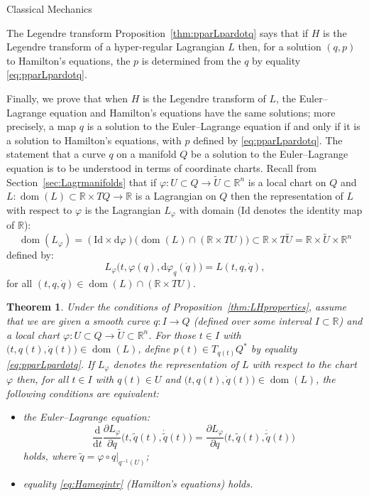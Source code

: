 \documentclass[oneside,a4paper,11pt]{amsbook}
\newcommand{\R}{\mathds R}
\newcommand{\dd}{\mathrm d}
\newcommand{\Id}{\mathrm{Id}}
\DeclareMathOperator{\Dom}{dom}
\theoremstyle{remark}\newtheorem{exercise}{Exercise}[chapter]
\theoremstyle{plain}\newtheorem{teo}{Theorem}[section]
\theoremstyle{plain}\newtheorem{lem}[teo]{Lemma}
\theoremstyle{plain}\newtheorem{prop}[teo]{Proposition}
\theoremstyle{plain}\newtheorem{cor}[teo]{Corollary}
\theoremstyle{definition}\newtheorem{defin}[teo]{Definition}
\theoremstyle{remark}\newtheorem{rem}[teo]{Remark}
\theoremstyle{definition}\newtheorem{notation}[teo]{Notation}
\theoremstyle{definition}\newtheorem{convention}[teo]{Convention}
\theoremstyle{definition}\newtheorem{example}[teo]{Example}
\numberwithin{section}{chapter}
\numberwithin{equation}{section}
\begin{document}
\begin{chapter}{Classical Mechanics}
\begin{section}{The Legendre transform}
Proposition~\ref{thm:pparLpardotq} says that if $H$ is the Legendre transform of a hyper-regular Lagrangian $L$ then, for a solution $(q,p)$
to Hamilton's equations, the $p$ is determined from the $q$ by equality \eqref{eq:pparLpardotq}.

\medskip

Finally, we prove that when $H$ is the Legendre transform of $L$, the Euler--Lagrange equation and Hamilton's equations have the same solutions;
more precisely, a map $q$ is a solution to the Euler--Lagrange equation if and only if it is a solution
to Hamilton's equations, with $p$ defined by \eqref{eq:pparLpardotq}. The statement that a curve $q$ on a manifold
$Q$ be a solution to the Euler--Lagrange equation is to be understood in terms of coordinate charts. Recall from
Section~\ref{sec:Lagrmanifolds} that if $\varphi:U\subset Q\to\widetilde U\subset\R^n$ is a local chart on $Q$ and $L:\Dom(L)\subset\R\times TQ\to\R$
is a Lagrangian on $Q$ then the representation of $L$ with respect to $\varphi$ is the Lagrangian $L_\varphi$
with domain ($\Id$ denotes the identity map of $\R$):
\[\Dom(L_\varphi)=(\Id\times\dd\varphi)\big(\!\Dom(L)\cap(\R\times TU)\big)\subset\R\times T\widetilde U=
\R\times\widetilde U\times\R^n\]
defined by:
\[L_\varphi\big(t,\varphi(q),\dd\varphi_q(\dot q)\big)=L(t,q,\dot q),\]
for all $(t,q,\dot q)\in\Dom(L)\cap(\R\times TU)$.
\begin{teo}\label{thm:ELHam}
Under the conditions of Proposition~\ref{thm:LHproperties}, assume that we are given a smooth curve $q:I\to Q$ (defined over some interval
$I\subset\R$) and a local chart $\varphi:U\subset Q\to\widetilde U\subset\R^n$. For those $t\in I$ with $\big(t,q(t),\dot q(t)\big)\in\Dom(L)$,
define $p(t)\in T_{q(t)}Q^*$ by equality \eqref{eq:pparLpardotq}. If $L_\varphi$ denotes the representation of $L$
with respect to the chart $\varphi$ then, for all $t\in I$ with $q(t)\in U$ and $\big(t,q(t),\dot q(t)\big)\in\Dom(L)$,
the following conditions are equivalent:
\begin{itemize}
\item[(a)] the Euler--Lagrange equation:
\begin{equation}\label{eq:ELchart2}
\frac{\dd}{\dd t}\frac{\partial L_\varphi}{\partial\dot q}\big(t,\tilde q(t),\dot{\tilde q}(t)\big)=
\frac{\partial L_\varphi}{\partial q}\big(t,\tilde q(t),\dot{\tilde q}(t)\big)
\end{equation}
holds, where $\tilde q=\varphi\circ q\vert_{q^{-1}(U)}$;
\medskip
\item[(b)] equality \eqref{eq:Hameqintr} (Hamilton's equations) holds.
\end{itemize}
\end{teo}


\end{section}
\end{chapter}
\end{document}
